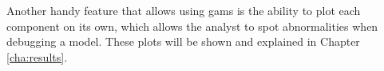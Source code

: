 %
%

Another handy feature that allows using \acp{gam} is the ability to plot each component on its own, which allows the analyst to spot abnormalities when debugging a model. These plots will be shown and explained in Chapter \ref{cha:results}.



